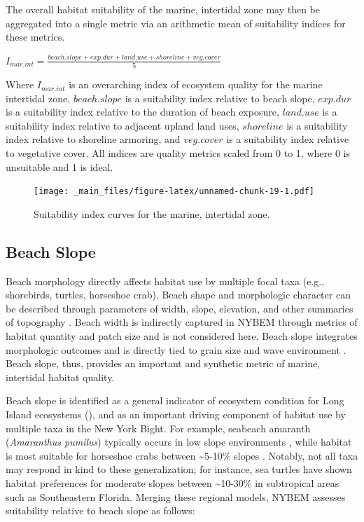 \documentclass[
]{book}
\begin{document}
The overall habitat suitability of the marine, intertidal zone may then be aggregated into a single metric via an arithmetic mean of suitability indices for these metrics.

\(I_{mar.int} = \frac{beach.slope + exp.dur + land.use + shoreline + veg.cover }{5}\)

Where \(I_{mar.int}\) is an overarching index of ecosystem quality for the marine intertidal zone, \(beach.slope\) is a suitability index relative to beach slope, \(exp.dur\) is a suitability index relative to the duration of beach exposure, \(land.use\) is a suitability index relative to adjacent upland land uses, \(shoreline\) is a suitability index relative to shoreline armoring, and \(veg.cover\) is a suitability index relative to vegetative cover. All indices are quality metrics scaled from 0 to 1, where 0 is unsuitable and 1 is ideal.

\begin{figure}
\centering
\texttt{[image: \_main\_files/figure-latex/unnamed-chunk-19-1.pdf]}
\caption{\label{fig:unnamed-chunk-19}Suitability index curves for the marine, intertidal zone.}
\end{figure}

\hypertarget{beach-slope}{%
\subsection{Beach Slope}\label{beach-slope}}

Beach morphology directly affects habitat use by multiple focal taxa (e.g., shorebirds, turtles, horseshoe crab). Beach shape and morphologic character can be described through parameters of width, slope, elevation, and other summaries of topography \citep{bridges_use_2015}. Beach width is indirectly captured in NYBEM through metrics of habitat quantity and patch size and is not considered here. Beach slope integrates morphologic outcomes and is directly tied to grain size and wave environment \citep{lodder_chapter_2021}. Beach slope, thus, provides an important and synthetic metric of marine, intertidal habitat quality.

Beach slope is identified as a general indicator of ecosystem condition for Long Island ecosystems (\citet{usace_evaluation_2009}), and as an important driving component of habitat use by multiple taxa in the New York Bight. For example, seabeach amaranth (\emph{Amaranthus pumilus}) typically occurs in low slope environments \citep{sellars_habitat_2007}, while habitat is most suitable for horseshoe crabs between \textasciitilde5-10\% slopes \citep{brady_habitat_1996}. Notably, not all taxa may respond in kind to these generalization; for instance, sea turtles have shown habitat preferences for moderate slopes between \textasciitilde10-30\% in subtropical areas such as Southeastern Florida. Merging these regional models, NYBEM assesses suitability relative to beach slope as follows:
\end{document}
